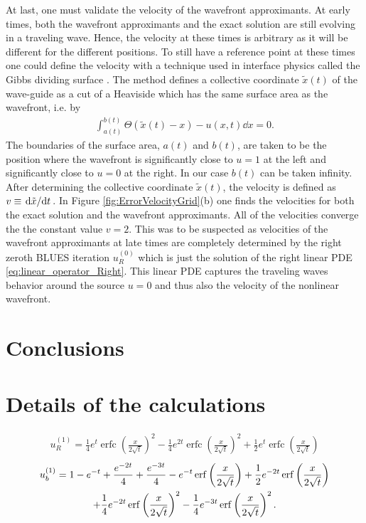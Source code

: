 \documentclass[amsmath,amssymb,amsfonts,aps,pre,preprint,superscriptaddress,bibnotes,showpacs,showkeys,longbibliography]{revtex4-1}
\DeclareMathOperator{\erfc}{erfc}
\begin{document}
At last, one must validate the velocity of the wavefront approximants. At early times, both the wavefront approximants and the exact solution are still evolving in a traveling wave. Hence, the velocity at these times is arbitrary as it will be different for the different positions. To still have a reference point at these times one could define the velocity with a technique used in interface physics called the Gibbs dividing surface \cite{gibbs1928collected,Lamorgese2017}. The method defines a collective coordinate $\tilde{x}(t)$ of the wave-guide as a cut of a Heaviside which has the same surface area as the wavefront, i.e. by
\begin{align}\label{eq:Gibbs_dividing_surface}
    \int_{a(t)}^{b(t)}  \Theta(\tilde{x}(t)-x)-u(x, t)\dd{x}  =0.
\end{align}
The boundaries of the surface area, $a(t)$ and $b(t)$, are taken to be the position where the wavefront is significantly close to $u=1$ at the left and significantly close to $u=0$ at the right. In our case $b(t)$ can be taken infinity. After determining the collective coordinate $\tilde{x}(t)$, the velocity is defined as $v\equiv \dv*{\tilde{x}}{t}$. In Figure \ref{fig:ErrorVelocityGrid}(b) one finds the velocities for both the exact solution and the wavefront approximants. All of the velocities converge the the constant value $v=2$. This was to be suspected as velocities of the wavefront approximants at late times are completely determined by the right zeroth BLUES iteration $u^{(0)}_R$ which is just the solution of the right linear PDE \eqref{eq:linear_operator_Right}. This linear PDE captures the traveling waves behavior around the source $u=0$ and thus also the velocity of the nonlinear wavefront.



\section{Conclusions}
\lipsum[2-3]
\label{sec:conclusion}
\cleardoublepage
\appendix
\section{Details of the calculations}
\label{sec:Details_of_the_calculculations}
\begin{align}
    u^{(1)}_R = \frac{1}{4} e^t \erfc\left(\frac{x}{2 \sqrt{t}}\right)^2-\frac{1}{4} e^{2 t} \erfc\left(\frac{x}{2 \sqrt{t}}\right)^2+\frac{1}{2} e^t \erfc\left(\frac{x}{2 \sqrt{t}}\right)
\end{align}
\begin{multline}
    u^{(1)}_b 
   =1-e^{-t}+\frac{e^{-2 t}}{4}+\frac{e^{-3 t}}{4}-e^{-t} \erf\left(\frac{x}{2 \sqrt{t}}\right)+\frac{1}{2} e^{-2 t} \erf\left(\frac{x}{2 \sqrt{t}}\right)\\+\frac{1}{4} e^{-2 t} \erf\left(\frac{x}{2 \sqrt{t}}\right)^2-\frac{1}{4} e^{-3 t} \erf\left(\frac{x}{2 \sqrt{t}}\right)^2.
\end{multline}
\end{document}

